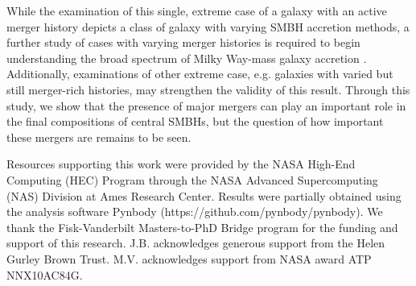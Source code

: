 \documentclass[]{emulateapj}
\begin{document}
While the examination of this single, extreme case of a galaxy with an active merger history depicts a class of galaxy with varying SMBH accretion methods, a further study of cases with varying merger histories is required to begin understanding the broad spectrum of Milky Way-mass galaxy accretion \citep{Pontzen2016}. Additionally, examinations of other extreme case, e.g. galaxies with varied but still merger-rich histories, may strengthen the validity of this result. Through this study, we show that the presence of major mergers can play an important role in the final compositions of central SMBHs, but the question of how important these mergers are remains to be seen.


\acknowledgments
Resources supporting this work were provided by the NASA High-End Computing (HEC) Program through the NASA Advanced Supercomputing (NAS) Division at Ames Research Center. Results were partially obtained using the analysis software Pynbody (https://github.com/pynbody/pynbody). We thank the Fisk-Vanderbilt Masters-to-PhD Bridge program for the funding and support of this research. J.B. acknowledges generous support from the Helen Gurley Brown Trust. M.V. acknowledges support from NASA award ATP NNX10AC84G.


\end{document}
